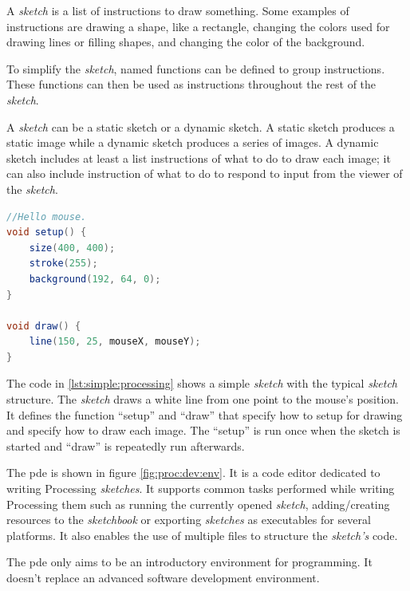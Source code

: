 \documentclass{./llncs2e/llncs}
\begin{document}
A \emph{sketch} is a list of instructions to draw something. Some examples of instructions are drawing a shape, like a rectangle, changing the colors used for drawing lines or filling shapes, and changing the color of the background.

To simplify the \emph{sketch}, named functions can be defined to group instructions. These functions can then be used as instructions throughout the rest of the \emph{sketch}.

A \emph{sketch} can be a static sketch or a dynamic sketch. A static sketch produces a static image while a dynamic sketch produces a series of images. A dynamic sketch includes at least a list instructions of what to do to draw each image; it can also include instruction of what to do to respond to input from the viewer of the \emph{sketch}.

\begin{lstlisting}[caption={A simple Processing sketch},label={lst:simple:processing},language=Java]
//Hello mouse.
void setup() {
    size(400, 400);
    stroke(255);
    background(192, 64, 0);
}
 
void draw() {
    line(150, 25, mouseX, mouseY);
}
\end{lstlisting}

The code in \ref{lst:simple:processing} shows a simple \emph{sketch} with the typical \emph{sketch} structure. The \emph{sketch} draws a white line from one point to the mouse's position. It defines the function ``setup'' and  ``draw'' that specify how to setup for drawing and specify how to draw each image. The ``setup'' is run once when the sketch is started and ``draw'' is repeatedly run afterwards.

The \ac{pde} is shown in figure \ref{fig:proc:dev:env}. It is a code editor dedicated to writing Processing \emph{sketches}. It supports common tasks performed while writing Processing them such as running the currently opened \emph{sketch}, adding/creating resources to the \emph{sketchbook} or exporting \emph{sketches} as executables for several platforms. It also enables the use of multiple files to structure the \emph{sketch's} code.

The \ac{pde} only aims to be an introductory environment for programming. It doesn't replace an advanced software development environment.
\end{document}
